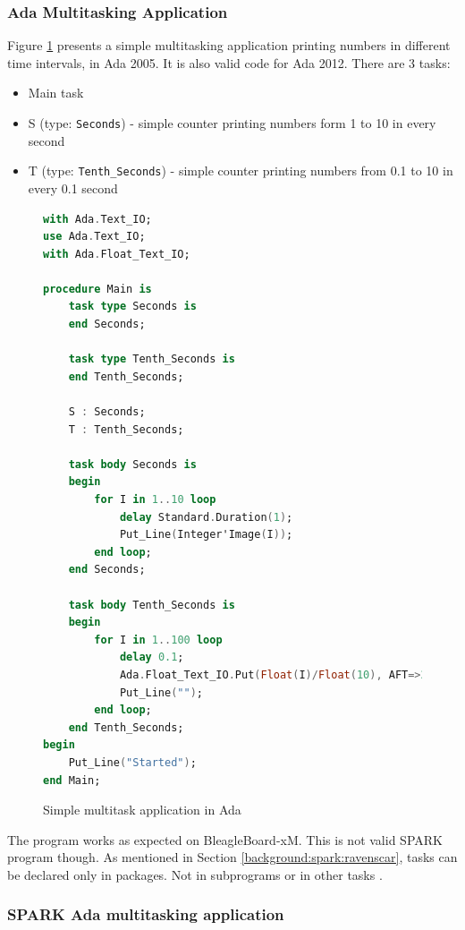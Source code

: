 \subsubsection{Ada Multitasking Application}

Figure \ref{listing:HelloTasking} presents a simple multitasking application printing numbers in different time intervals, in Ada 2005. It is also valid code for Ada 2012. There are 3 tasks:
\begin{itemize}
    \item Main task
    \item S (type: \lstinline{Seconds}) - simple counter printing numbers form 1 to 10 in every second
    \item T (type: \lstinline{Tenth_Seconds}) - simple counter printing numbers from 0.1 to 10 in every 0.1 second
\end{itemize}

\begin{figure}
\singlespacing
\begin{lstlisting}[language=ada, frame=single, gobble=0]
with Ada.Text_IO;
use Ada.Text_IO;
with Ada.Float_Text_IO;

procedure Main is
    task type Seconds is
    end Seconds;

    task type Tenth_Seconds is
    end Tenth_Seconds;

    S : Seconds;
    T : Tenth_Seconds;

    task body Seconds is
    begin
        for I in 1..10 loop
            delay Standard.Duration(1);
            Put_Line(Integer'Image(I));
        end loop;
    end Seconds;

    task body Tenth_Seconds is
    begin
        for I in 1..100 loop            
            delay 0.1;            
            Ada.Float_Text_IO.Put(Float(I)/Float(10), AFT=>2, EXP=>0);
            Put_Line("");
        end loop;
    end Tenth_Seconds;
begin
    Put_Line("Started");
end Main;
\end{lstlisting} 
\doublespacing
\caption{Simple multitask application in Ada}
\label{listing:HelloTasking}
\end{figure}

The program works as expected on BleagleBoard-xM. This is not valid SPARK program though. As mentioned in Section \ref{background:spark:ravenscar}, tasks can be declared only in packages. Not in subprograms or in other tasks \cite{Barnes:Book}.

\subsubsection{SPARK Ada multitasking application}

